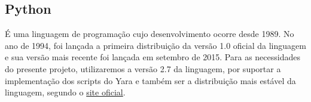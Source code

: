 \subsection{Python}
\label{sub:Python}

É uma linguagem de programação cujo desenvolvimento ocorre desde 1989. No ano
de 1994, foi lançada a primeira distribuição da versão 1.0 oficial da
linguagem e sua versão mais recente foi lançada em setembro de 2015. Para as
necessidades do presente projeto, utilizaremos a versão 2.7 da linguagem, por
suportar a implementação dos scripts do Yara e também ser a distribuição mais
estável da linguagem, segundo o \href{www.python.org}{site oficial}.



